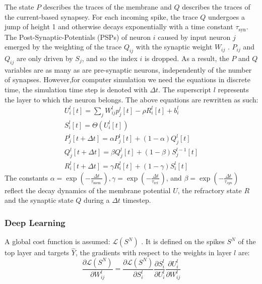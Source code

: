 \documentclass[12pt]{report}
\begin{document}
The state $P$ describes the traces of the membrane and $Q$ describes the traces of the current-based synapsey. For each incoming spike, the trace $Q$ undergoes a jump of height 1 and otherwise decays exponentially with a time constant $\tau_{\mathrm{syn}}$. The Post-Synaptic-Potentials (PSPs) of neuron $i$ caused by input neuron $j$ emerged by the weighting of the trace $Q_{i j}$ with the synaptic weight $W_{i j}$ . $P_{i j}$ and $Q_{i j}$ are only driven by $S_{j}$, and so the index $i$ is dropped. As a result, the $P$ and $Q$ variables are as many as are pre-synaptic neurons, independently of the number of synapses. 
However,for computer simulation we need the equations in discrete time, the simulation time step is denoted with $\Delta t$. The superscript $l$ represents the layer to which the neuron belongs. The above equations are rewritten as such:
\begin{equation}
\begin{aligned}
U_{i}^{l}[t]=\sum_{j} W_{i j}^{l} p_{j}^{l}[t]-\rho R_{i}^{l}[t]+b_{i}^{l} \\
S_{i}^{l}[t]=\Theta\left(U_{i}^{l}[t]\right) \\
P_{j}^{l}[t+\Delta t]=\alpha P_{j}^{l}[t]+(1-\alpha) Q_{j}^{l}[t] \\
Q_{j}^{l}[t+\Delta t]=\beta Q_{j}^{l}[t]+(1-\beta) S_{j}^{l-1}[t] \\
R_{i}^{l}[t+\Delta t]=\gamma R_{i}^{l}[t]+(1-\gamma) S_{i}^{l}[t]
\end{aligned}
\end{equation}
The constants $\alpha=\exp \left(-\frac{\Delta t}{\tau_{\text {mem }}}\right), \gamma=\exp \left(-\frac{\Delta t}{\tau_{\text {ref }}}\right)$, and $\beta=\exp \left(-\frac{\Delta t}{\tau_{s y n}}\right)$ reflect the decay dynamics of the membrane potential $U$, the refractory state $R$ and the synaptic state $Q$ during a $\Delta t$ timestep.
\subsubsection{Deep Learning}
A global cost function is assumed: $\mathcal{L}\left(S^{N}\right)$ . It is defined on the spikes $S^{N}$ of the top layer and targets $\hat{Y}$, the gradients with respect to the weights in layer $l$ are:
\begin{equation}
\frac{\partial \mathcal{L}\left(S^{N}\right)}{\partial W_{i j}^{l}}=\frac{\partial \mathcal{L}\left(S^{N}\right)}{\partial S_{i}^{l}} \frac{\partial S_{i}^{l}}{\partial U_{i}^{l}} \frac{\partial U_{i}^{l}}{\partial W_{i j}^{l}}
\end{equation}
\end{document}
